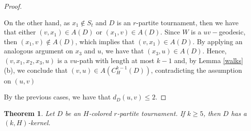 \documentclass[10pt,a4paper]{article}
\newtheorem{theorem}{Theorem}[section]
\begin{document}
\begin{proof}
\begin{description}
On the other hand, as $x_{1} \notin S_{t}$ and $D$ is an $r$-partite tournament, then we have that either $(v,x_{1}) \in A(D)$ or $(x_{1},v) \in A(D)$. Since $W$ is a $uv-$geodesic, then $(x_{1},v) \notin A(D)$, which implies that $(v,x_{1}) \in A(D)$. By applying an analogous argument on $x_{3}$ and $u$, we have that $(x_{3},u) \in A(D)$. Hence, $(v,x_{1}, x_{2}, x_{3}, u)$ is a $vu$-path with length at most $k-1$ and, by Lemma \ref{walks} (b), we conclude that $(v,u) \in A(C_{H}^{k-1}(D))$, contradicting the assumption on $(u,v)$
\end{description}

By the previous cases, we have that $d_{D}(u,v) \leq 2$. 
\end{proof}


\begin{theorem}
\label{panpart}
Let $D$ be an $H$-colored $r$-partite tournament. If $k \geq 5$, then $D$ has a $(k,H)$-kernel. 
\end{theorem}
\end{document}
